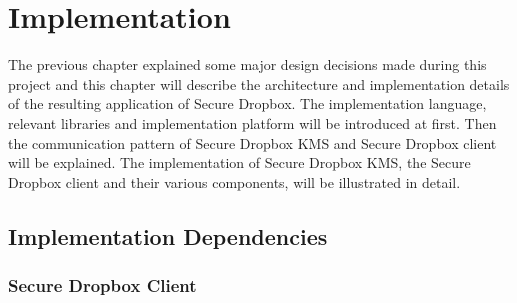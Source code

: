 \chapter{Implementation}

The previous chapter explained some major design decisions made during this project and this chapter will describe the architecture and implementation details of the resulting application of Secure Dropbox. The implementation language, relevant libraries and implementation platform will be introduced at first. Then the communication pattern of Secure Dropbox KMS and Secure Dropbox client will be explained. The implementation of Secure Dropbox KMS, the Secure Dropbox client and their various components, will be illustrated in detail.

\section{Implementation Dependencies}

\subsection{Secure Dropbox Client}

